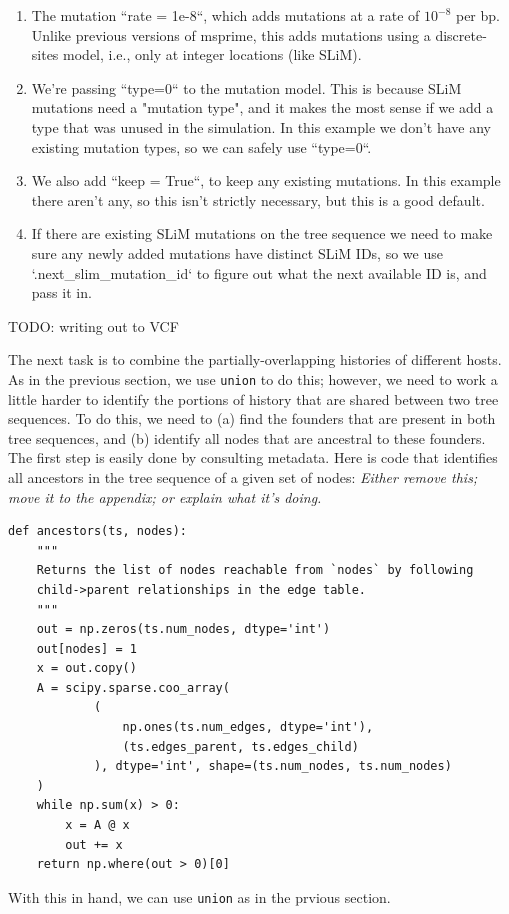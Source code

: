 \documentclass[12pt]{article}
\newcommand{\comment}[1]{\textit{\color{green} #1}}
\begin{document}
\begin{enumerate}
    \item The mutation ``rate = 1e-8``, which adds mutations at a rate of $10^{-8}$ per bp.
    Unlike previous versions of msprime, this adds mutations using a discrete-sites model,
    i.e., only at integer locations (like SLiM).

\item We're passing ``type=0`` to the mutation model.
    This is because SLiM mutations need a "mutation type",
    and it makes the most sense if we add a type that was unused in the simulation.
    In this example we don't have any existing mutation types, so we can safely use ``type=0``.

\item We also add ``keep = True``, to keep any existing mutations.
    In this example there aren't any, so this isn't strictly necessary,
    but this is a good default.

\item If there are existing SLiM mutations on the tree sequence we need to
    make sure any newly added mutations have distinct SLiM IDs,
    so we use `.next\_slim\_mutation\_id` to figure out
    what the next available ID is, and pass it in.

\end{enumerate}

TODO: writing out to VCF

The next task is to combine the partially-overlapping histories of different hosts.
As in the previous section, we use \verb|union| to do this;
however, we need to work a little harder
to identify the portions of history that are shared between two tree sequences.
To do this, we need to
(a) find the founders that are present in both tree sequences,
and (b) identify all nodes that are ancestral to these founders.
The first step is easily done by consulting metadata.
Here is code that identifies all ancestors in the tree sequence
of a given set of nodes:
\comment{Either remove this; move it to the appendix; or explain what it's doing.}
\begin{verbatim}
def ancestors(ts, nodes):
    """
    Returns the list of nodes reachable from `nodes` by following
    child->parent relationships in the edge table.
    """
    out = np.zeros(ts.num_nodes, dtype='int')
    out[nodes] = 1
    x = out.copy()
    A = scipy.sparse.coo_array(
            (
                np.ones(ts.num_edges, dtype='int'),
                (ts.edges_parent, ts.edges_child)
            ), dtype='int', shape=(ts.num_nodes, ts.num_nodes)
    )
    while np.sum(x) > 0:
        x = A @ x
        out += x
    return np.where(out > 0)[0]
\end{verbatim}
With this in hand, we can use \verb|union|
as in the prvious section.
\end{document}
